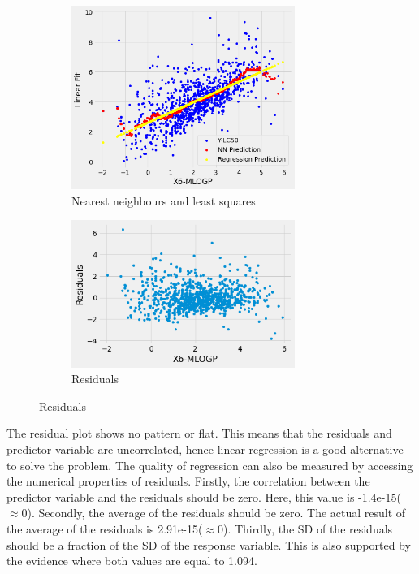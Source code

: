 \documentclass{ueacmpstyle}
\begin{document}
	    \begin{figure}[!htb]
		   	\centering
		    \begin{subfigure} [!htb]{0.3\textwidth}
		    	\centering
		    	\includegraphics[width=0.8\textwidth]{simpleregression.png}	
		    	\caption{Nearest neighbours and least squares}
		    	\label{fig3:x1}	
		    \end{subfigure}
    		\qquad
		    \begin{subfigure} [!htb]{0.3\textwidth}
		    	\centering
		    	\includegraphics[width=0.8\textwidth]{simpleresiduals.png}	
		    	\caption{Residuals}
		    	\label{fig3:x2}
		    \end{subfigure}
		    \label{fig3}
		\end{figure}
		\newpage
		The residual plot shows no pattern or flat. This means that the residuals and predictor variable are uncorrelated, hence linear regression is a good alternative to solve the problem. The quality of regression can also be measured by accessing the numerical properties of residuals. Firstly, the correlation between the predictor variable and the residuals should be zero. Here, this value is -1.4e-15($\approx0$). Secondly, the average of the residuals should be zero. The actual result of the average of the residuals is 2.91e-15($\approx0$). Thirdly, the SD of the residuals should be a fraction of the SD of the response variable. This is also supported by the evidence where both values are equal to 1.094.
	    
\end{document}
